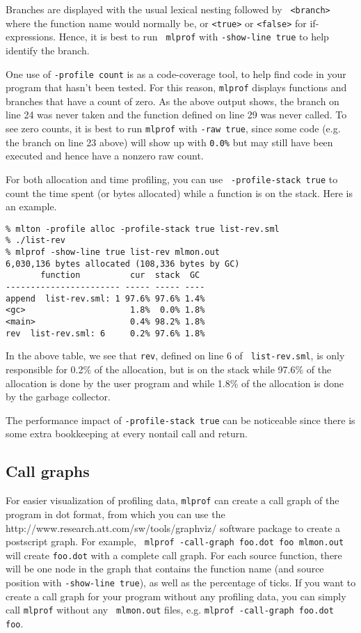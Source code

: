 Branches are displayed with the usual lexical nesting followed by {\tt
<branch>} where the function name would normally be, or {\tt <true>}
or {\tt <false>} for if-expressions.  Hence, it is best to run {\tt
mlprof} with {\tt -show-line true} to help identify the branch.

One use of {\tt -profile count} is as a code-coverage tool, to help
find code in your program that hasn't been tested.  For this reason,
{\tt mlprof} displays functions and branches that have a count of
zero.  As the above output shows, the branch on line 24 was never
taken and the function defined on line 29 was never called.  To see
zero counts, it is best to run {\tt mlprof} with {\tt -raw true},
since some code (e.g. the branch on line 23 above) will show up with
{\tt 0.0\%} but may still have been executed and hence have a nonzero
raw count.
%

For both allocation and time profiling, you can use {\tt
-profile-stack true} to count the time spent (or bytes allocated)
while a function is on the stack.  Here is an example.

\begin{verbatim}
% mlton -profile alloc -profile-stack true list-rev.sml
% ./list-rev
% mlprof -show-line true list-rev mlmon.out
6,030,136 bytes allocated (108,336 bytes by GC)
       function          cur  stack  GC 
----------------------- ----- ----- ----
append  list-rev.sml: 1 97.6% 97.6% 1.4%
<gc>                     1.8%  0.0% 1.8%
<main>                   0.4% 98.2% 1.8%
rev  list-rev.sml: 6     0.2% 97.6% 1.8%
\end{verbatim}
%
In the above table, we see that {\tt rev}, defined on line 6 of {\tt
list-rev.sml}, is only responsible for 0.2\% of the allocation, but is
on the stack while 97.6\% of the allocation is done by the user
program and while 1.8\% of the allocation is done by the garbage
collector.

The performance impact of {\tt -profile-stack true} can be noticeable
since there is some extra bookkeeping at every nontail call and
return.
%
\subsection{Call graphs}

For easier visualization of profiling data, {\tt mlprof} can create a
call graph of the program in dot format, from which you can use the
		  {http://www.research.att.com/sw/tools/graphviz/}
software package to create a postscript graph.  For example, {\tt
mlprof -call-graph foo.dot foo mlmon.out} will create {\tt foo.dot}
with a complete call graph.  For each source function, there will be
one node in the graph that contains the function name (and source
position with {\tt -show-line true}), as well as the percentage of
ticks.  If you want to create a call graph for your program without
any profiling data, you can simply call {\tt mlprof} without any {\tt
mlmon.out} files, e.g. {\tt mlprof -call-graph foo.dot foo}.

